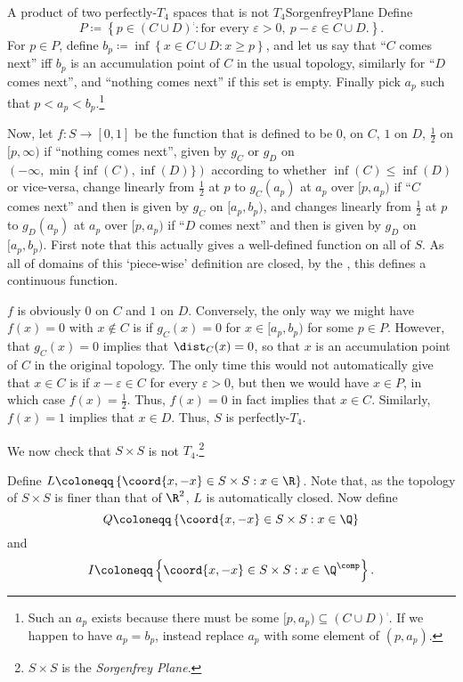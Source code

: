 \begin{exm}{A product of two perfectly-$T_4$ spaces that is not $T_4$}{SorgenfreyPlane}
Define
\begin{equation}
P\coloneqq \left\{ p\in (C\cup D)^{\comp}:\text{for every }\varepsilon >0,\ p-\varepsilon \in C\cup D\text{.}\right\} .
\end{equation}
For $p\in P$, define $b_p\coloneqq \inf \left\{ x\in C\cup D:x\geq p\right\}$, and let us say that ``$C$ comes next'' iff $b_p$ is an accumulation point of $C$ in the usual topology, similarly for ``$D$ comes next'', and ``nothing comes next'' if this set is empty.  Finally pick $a_p$ such that $p<a_p<b_p$.\footnote{Such an $a_p$ exists because there must be some $[p,a_p)\subseteq (C\cup D)^{\comp}$.  If we happen to have $a_p=b_p$, instead replace $a_p$ with some element of $(p,a_p)$.}

Now, let $f\colon S\rightarrow [0,1]$ be the function that is defined to be $0$, on $C$, $1$ on $D$, $\tfrac{1}{2}$ on $[p,\infty )$ if ``nothing comes next'', given by $g_C$ or $g_D$ on $(-\infty ,\min \{ \inf (C),\inf (D)\} )$ according to whether $\inf (C)\leq \inf (D)$ or vice-versa, change linearly from $\frac{1}{2}$ at $p$ to $g_C(a_p)$ at $a_p$ over $[p,a_p)$ if ``$C$ comes next'' and then is given by $g_C$ on $[a_p,b_p)$, and changes linearly from $\frac{1}{2}$ at $p$ to $g_D(a_p)$ at $a_p$ over $[p,a_p)$ if ``$D$ comes next'' and then is given by $g_D$ on $[a_p,b_p)$.  First note that this actually gives a well-defined function on all of $S$.  As all of domains of this `piece-wise' definition are closed, by the , this defines a continuous function.

$f$ is obviously $0$ on $C$ and $1$ on $D$.  Conversely, the only way we might have $f(x)=0$ with $x\notin C$ is if $g_C(x)=0$ for $x\in [a_p,b_p)$ for some $p\in P$.  However, that $g_C(x)=0$ implies that $\dist _C(x)=0$, so that $x$ is an accumulation point of $C$ in the original topology.  The only time this would not automatically give that $x\in C$ is if $x-\varepsilon \in C$ for every $\varepsilon >0$, but then we would have $x\in P$, in which case $f(x)=\frac{1}{2}$.  Thus, $f(x)=0$ in fact implies that $x\in C$.  Similarly, $f(x)=1$ implies that $x\in D$.  Thus, $S$ is perfectly-$T_4$.

We now check that $S\times S$ is not $T_4$.\footnote{$S\times S$ is the \emph{Sorgenfrey Plane}.}

Define $L\coloneqq \left\{ \coord{x,-x}\in S\times S:x\in \R \right\}$.  Note that, as the topology of $S\times S$ is finer than that of $\R ^2$, $L$ is automatically closed.  Now define
\begin{equation}
Q\coloneqq \left\{ \coord{x,-x}\in S\times S:x\in \Q \right\}
\end{equation}
and
\begin{equation}
I\coloneqq \left\{ \coord{x,-x}\in S\times S:x\in \Q ^{\comp}\right\} .
\end{equation}


\end{exm}
